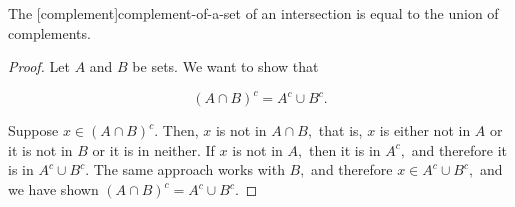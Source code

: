 \documentclass{article}
\begin{document}
\begin{theorem}\label{complement-of-intersection-is-union-of-complements}
The \@[complement]{complement-of-a-set} of an intersection is equal to the union of complements.
\end{theorem}

\begin{proof}
Let $A$ and $B$ be \@{sets}. We want to show that

\[ (A \cap B)^c = A^c \cup B^c. \]

Suppose $x \in (A \cap B)^c.$ Then, $x$ is not in $A \cap B,$ that is, $x$ is either not in $A$ or it is not in $B$ or it is in neither. If $x$ is not in $A,$ then it is in $A^c,$ and therefore it is in $A^c \cup B^c.$ The same approach works with $B,$ and therefore $x \in  A^c \cup B^c,$ and we have shown $(A \cap B)^c = A^c \cup B^c.$
\end{proof}
\end{document}
